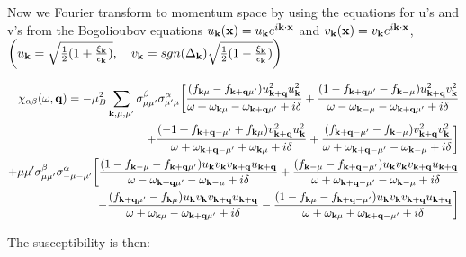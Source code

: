 \documentclass[prb,showpacs,amssymb,amsmath,twocolumn]{revtex4-1}
\begin{document}
\begin{widetext}
Now we Fourier transform to momentum space by using the equations for u's and v's from the Bogolioubov equations $u_{\bf k}({\bf x})=u_{\bf k} e^{i{\bf k}\cdot{\bf x}}$ and $v_{\bf k}({\bf x})=v_{\bf k} e^{i{\bf k}\cdot{\bf x}}$, $\bigg(u_{\bf k} = \sqrt{\frac{1}{2}(1+\frac{\xi_{\bf k}}{\epsilon_{\bf k}})},\quad v_{\bf k} = sgn(\Delta_{\bf k})\sqrt{\frac{1}{2}(1-\frac{\xi_{\bf k}}{\epsilon_{\bf k}})}\bigg)$

\begin{align*}
\chi_{\alpha\beta}(\omega,{\bf q}) = -\mu_B^2 \sum\limits_{{\bf k},\mu,\mu'} \sigma^\beta_{\mu\mu'}\sigma^\alpha_{\mu'\mu}\bigg[\frac{(f_{{\bf k}\mu}-f_{{\bf k}+{\bf q}\mu'})u_{{\bf k}+{\bf q}}^2u_{\bf k}^2} {\omega+ \omega_{{\bf k}\mu}-\omega_{{\bf k}+{\bf q}\mu'}+i\delta}
+\frac{(1-f_{{\bf k}+{\bf q}\mu'}-f_{{\bf k}-\mu})u_{{\bf k}+{\bf q}}^2v_{\bf k}^2} {\omega-\omega_{{\bf k}-\mu}-\omega_{{\bf k}+{\bf q}\mu'}+i\delta}\\
+\frac{(-1+f_{{\bf k}+{\bf q}-\mu'}+f_{{\bf k}\mu})v_{{\bf k}+{\bf q}}^2u_{\bf k}^2} {\omega+\omega_{{\bf k}+{\bf q}-\mu'}+\omega_{{\bf k}\mu}+i\delta}
+\frac{(f_{{\bf k}+{\bf q}-\mu'}-f_{{\bf k}-\mu})v_{{\bf k}+{\bf q}}^2v_{\bf k}^2} {\omega+\omega_{{\bf k}+{\bf q}-\mu'}-\omega_{{\bf k}-\mu}+i\delta}\bigg] 
\\
+\mu\mu' \sigma^\beta_{\mu\mu'}\sigma^\alpha_{-\mu-\mu'}\bigg[\frac{(1-f_{{\bf k}-\mu}-f_{{\bf k}+{\bf q}\mu'})u_{\bf k} v_{\bf k} v_{{\bf k}+{\bf q}}u_{{\bf k}+{\bf q}}} {\omega-\omega_{{\bf k}+{\bf q}\mu'} - \omega_{{\bf k}-\mu}+i\delta}
+\frac{(f_{{\bf k}-\mu}-f_{{\bf k}+{\bf q}-\mu'})u_{\bf k} v_{\bf k} v_{{\bf k}+{\bf q}}u_{{\bf k}+{\bf q}}} {\omega+\omega_{{\bf k}+{\bf q}-\mu'}-\omega_{{\bf k}-\mu}+i\delta} \\
-\frac{(f_{{\bf k}+{\bf q}\mu'}-f_{{\bf k}\mu})u_{\bf k} v_{\bf k} v_{{\bf k}+{\bf q}}u_{{\bf k}+{\bf q}}} {\omega+\omega_{{\bf k}\mu}-\omega_{{\bf k}+{\bf q}\mu'}+i\delta}
-\frac{(1-f_{{\bf k}\mu}-f_{{\bf k}+{\bf q}-\mu'})u_{\bf k} v_{\bf k} v_{{\bf k}+{\bf q}}u_{{\bf k}+{\bf q}}} {\omega+\omega_{{\bf k}\mu}+\omega_{{\bf k}+{\bf q}-\mu'}+i\delta}\bigg]
\end{align*}

The susceptibility is then:


\end{widetext}
\end{document}
